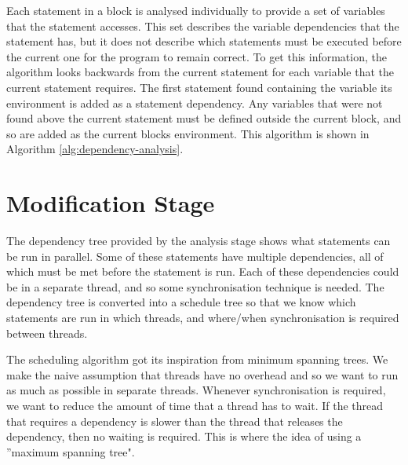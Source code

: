 Each statement in a block is analysed individually to provide a set of variables that the statement accesses. This set describes the variable dependencies that the statement has, but it does not describe which statements must be executed before the current one for the program to remain correct. To get this information, the algorithm looks backwards from the current statement for each variable that the current statement requires. The first statement found containing the variable its environment is added as a statement dependency. Any variables that were not found above the current statement must be defined outside the current block, and so are added as the current blocks environment. This algorithm is shown in Algorithm \autoref{alg:dependency-analysis}.


\section{Modification Stage}

The dependency tree provided by the analysis stage shows what statements can be run in parallel. Some of these statements have multiple dependencies, all of which must be met before the statement is run. Each of these dependencies could be in a separate thread, and so some synchronisation technique is needed. The dependency tree is converted into a schedule tree so that we know which statements are run in which threads, and where/when synchronisation is required between threads.

The scheduling algorithm got its inspiration from minimum spanning trees. We make the naive assumption that threads have no overhead and so we want to run as much as possible in separate threads. Whenever synchronisation is required, we want to reduce the amount of time that a thread has to wait. If the thread that requires a dependency is slower than the thread that releases the dependency, then no waiting is required. This is where the idea of using a ''maximum spanning tree".


